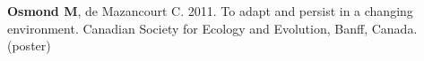 \documentclass[12pt]{article}
\begin{document}
\textbf{Osmond M}, de Mazancourt C. 2011. To adapt and persist in a changing environment. Canadian Society for Ecology and Evolution, Banff, Canada. (poster)








\end{document}
